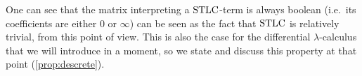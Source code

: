 \begin{remark}
One can see that the matrix interpreting a $\mathrm{STLC}$-term is always boolean (i.e.\ its coefficients are either $0$ or $\infty$) can be seen as the fact that $\mathrm{STLC}$ is relatively trivial, from this point of view.
This is also the case for the differential $\lambda$-calculus that we will introduce in a moment, so we state and discuss this property at that point (\autoref{prop:descrete}).
\end{remark}


